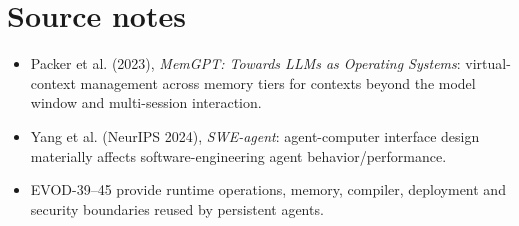 \chapter*{Source notes}
\begin{itemize}
\item Packer et al. (2023), \emph{MemGPT: Towards LLMs as Operating Systems}: virtual-context management across memory tiers for contexts beyond the model window and multi-session interaction.
\item Yang et al. (NeurIPS 2024), \emph{SWE-agent}: agent-computer interface design materially affects software-engineering agent behavior/performance.
\item EVOD-39--45 provide runtime operations, memory, compiler, deployment and security boundaries reused by persistent agents.
\end{itemize}